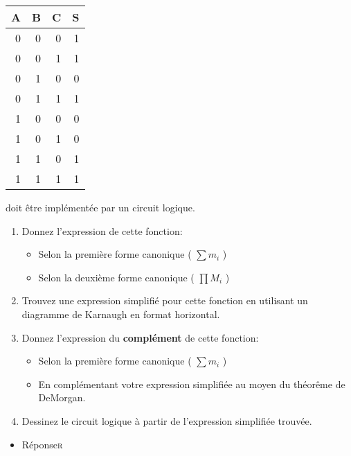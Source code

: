\documentclass[11pt]{article}
\begin{document}
\begin{center}
\begin{tabular}{rrrr}
A & B & C & S\\
\hline
0 & 0 & 0 & 1\\
0 & 0 & 1 & 1\\
0 & 1 & 0 & 0\\
0 & 1 & 1 & 1\\
1 & 0 & 0 & 0\\
1 & 0 & 1 & 0\\
1 & 1 & 0 & 1\\
1 & 1 & 1 & 1\\
\end{tabular}
\end{center}

doit être implémentée par un circuit logique.

\begin{enumerate}
\item Donnez l'expression de cette fonction:

\begin{itemize}
\item Selon la première forme canonique ( \(\sum m_i\) )

\item Selon la deuxième forme canonique ( \(\prod M_i\) )
\end{itemize}

\item Trouvez une expression simplifié pour cette fonction en utilisant
un diagramme de Karnaugh en format horizontal.

\item Donnez l'expression du \textbf{complément} de cette fonction:

\begin{itemize}
\item Selon la première forme canonique ( \(\sum m_i\) )

\item En complémentant votre expression simplifiée au moyen du
théorême de DeMorgan.
\end{itemize}

\item Dessinez le circuit logique à partir de l'expression simplifiée
trouvée.
\end{enumerate}

\begin{itemize}
\item Réponse\hfill{}\textsc{r}
\label{sec:org493490f}
\end{itemize}
\end{document}
